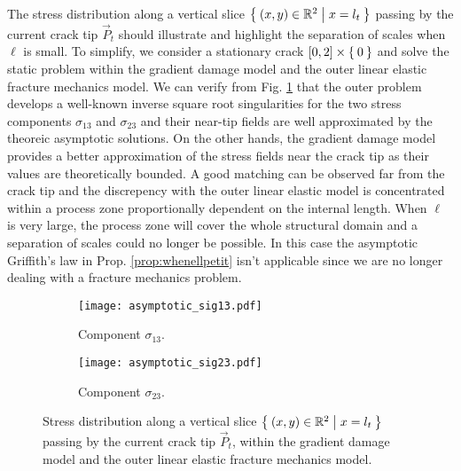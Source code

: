 The stress distribution along a vertical slice $\Set{(x,y)\in\mathbb{R}^2|x=l_t}$ passing by the current crack tip $\vec{P}_t$ should illustrate and highlight the separation of scales when $\ell$ is small. To simplify, we consider a stationary crack $[0,2]\times\Set{0}$ and solve the static problem within the gradient damage model and the outer linear elastic fracture mechanics model. We can verify from Fig. \ref{fig:stress} that the outer problem develops a well-known inverse square root singularities for the two stress components $\sigma_{13}$ and $\sigma_{23}$ and their near-tip fields are well approximated by the theoreic asymptotic solutions. On the other hands, the gradient damage model provides a better approximation of the stress fields near the crack tip as their values are theoretically bounded. A good matching can be observed far from the crack tip and the discrepency with the outer linear elastic model is concentrated within a process zone proportionally dependent on the internal length. When $\ell$ is very large, the process zone will cover the whole structural domain and a separation of scales could no longer be possible. In this case the asymptotic Griffith's law in Prop. \ref{prop:whenellpetit} isn't applicable since we are no longer dealing with a fracture mechanics problem.
\begin{figure}[htbp]
\centering
\begin{subfigure}[b]{0.48\textwidth}
\centering
\texttt{[image: asymptotic\_sig13.pdf]}
\caption{Component $\sigma_{13}$.}
\end{subfigure}
\begin{subfigure}[b]{0.48\textwidth}
\centering
\texttt{[image: asymptotic\_sig23.pdf]}
\caption{Component $\sigma_{23}$.}
\end{subfigure}
\caption{Stress distribution along a vertical slice $\Set{(x,y)\in\mathbb{R}^2|x=l_t}$ passing by the current crack tip $\vec{P}_t$, within the gradient damage model and the outer linear elastic fracture mechanics model.} \label{fig:stress}
\end{figure}

